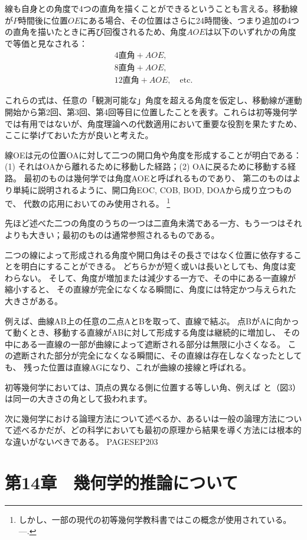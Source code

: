 \documentclass[a4paper,11pt,openany]{ltjsbook}
\newcommand{\etc}{\text{etc}}
\newcommand{\Ed}{\text{Ed}}
\begin{document}
線も自身との角度で4つの直角を描くことができるということも言える。移動線が$P$時間後に位置$OE$にある場合、その位置はさらに24時間後、つまり追加の4つの直角を描いたときに再び回復されるため、角度$AOE$は以下のいずれかの角度で等価と見なされる：
\begin{align*}
4\text{直角} + AOE, \\
8\text{直角} + AOE, \\
12\text{直角} + AOE, \quad \etc.
\end{align*}

これらの式は、任意の「観測可能な」角度を超える角度を仮定し、移動線が運動開始から第2回、第3回、第4回等目に位置したことを表す。これらは初等幾何学では有用ではないが、角度理論への代数適用において重要な役割を果たすため、ここに挙げておいた方が良いと考えた。

線OEは元の位置OAに対して二つの開口角や角度を形成することが明白である：
(1) それはOAから離れるために移動した経路；(2) OAに戻るために移動する経路。
最初のものは幾何学では角度AOEと呼ばれるものであり、
第二のものはより単純に説明されるように、開口角EOC, COB, BOD, DOAから成り立つもので、
代数の応用においてのみ使用される。
\footnote{しかし、一部の現代の初等幾何学教科書ではこの概念が使用されている。---\Ed.}

先ほど述べた二つの角度のうちの一つは二直角未満である一方、もう一つはそれよりも大きい；最初のものは通常参照されるものである。

二つの線によって形成される角度や開口角はその長さではなく位置に依存することを明白にすることができる。
どちらかが短く或いは長いとしても、角度は変わらない。
そして、角度が増加または減少する一方で、その中にある一直線が縮小すると、
その直線が完全になくなる瞬間に、角度には特定かつ与えられた大きさがある。

例えば、曲線AB上の任意の二点AとBを取って、直線で結ぶ。
点BがAに向かって動くとき、移動する直線がABに対して形成する角度は継続的に増加し、
その中にある一直線の一部が曲線によって遮断される部分は無限に小さくなる。
この遮断された部分が完全になくなる瞬間に、その直線は存在しなくなったとしても、
残った位置は直線AGになり、これが曲線の接線と呼ばれる。

初等幾何学においては、頂点の異なる側に位置する等しい角、例えば $ と $（図3）は同一の大きさの角として扱われます。

次に幾何学における論理方法について述べるか、あるいは一般の論理方法について述べるかだが、どの科学においても最初の原理から結果を導く方法には根本的な違いがないべきである。 PAGESEP{203}

\chapter{第14章　幾何学的推論について}
\end{document}
